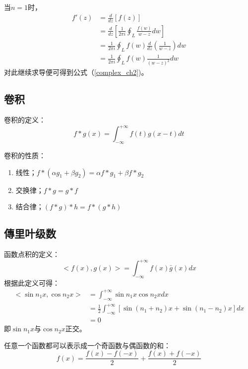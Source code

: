 	当$n=1$时，
	\begin{equation}
	\begin{aligned}
		f'(z) 
		&= \frac{d}{dz}[f(z)]	\\
		&= \frac{d}{dz}[\frac{1}{2\pi i}\oint_L\frac{f(w)}{w-z}dw]	\\
		&= \frac{1}{2\pi i}\oint_Lf(w)\frac{d}{dz}(\frac{1}{w-z})dw\\
		&= \frac{1}{2\pi i}\oint_Lf(w)\frac{1}{(w-z)^2}dw
	\end{aligned}
	\end{equation}
	对此继续求导便可得到公式（\ref{complex_ch2})。

\subsection{卷积}
	卷积的定义：
	\begin{equation}
	\label{convolution}
		f*g(x)=\int_{-\infty}^{+\infty} f(t)g(x-t)dt
	\end{equation}
	
	卷积的性质：
	\begin{enumerate}[itemindent=3em]
		\item 线性；$f*(\alpha g_1 + \beta g_2) = \alpha f*g_1 + \beta f*g_2$
		\item 交换律；$f*g=g*f$
		\item 结合律；$(f*g)*h = f*(g*h)$
	\end{enumerate}

\subsection{傳里叶级数}
	函数点积的定义：
	\begin{equation}
	\label{dot_product}
		<f(x),g(x)> = \int_{-\infty}^{+\infty}f(x)\bar{g}(x)dx
	\end{equation}
	根据此定义可得：
	\begin{equation*}
	\begin{aligned}
		<\sin n_1x, \cos n_2x> 
		&= \int_{-\infty}^{+\infty}\sin n_1x\cos n_2xdx	\\
		&= \frac{1}{2}\int_{-\infty}^{+\infty}[\sin (n_1+n_2)x + \sin (n_1-n_2)x]dx	\\
		&= 0
	\end{aligned}
	\end{equation*}
	即$\sin n_1x$与$\cos n_2x$正交。
	
	任意一个函数都可以表示成一个奇函数与偶函数的和：
	\begin{equation*}
		f(x) = \frac{f(x)-f(-x)}{2}+\frac{f(x)+f(-x)}{2}
	\end{equation*}
	
